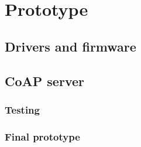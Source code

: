 \section{Prototype}

\subsection{Drivers and firmware}

\subsection{CoAP server}

\subsubsection{Testing}

\subsubsection{Final prototype}
